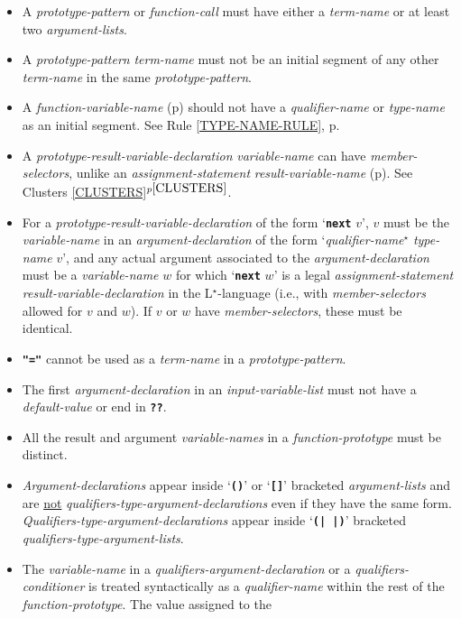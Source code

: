 \documentclass[12pt]{article}
\newcommand{\LSTAR}{L$^\star$}
\newcommand{\TT}[1]{{\tt \bfseries #1}}
\newcommand{\itemref}[1]{\ref{#1}$^{p\pageref{#1}}$}
\newcommand{\pagref}[1]{p\pageref{#1}}
\newcommand{\STAR}{{\Large $^\star$}}
\newenvironment{indpar}[1][0.3in]%
	{\begin{list}{}%
		     {\setlength{\itemsep}{0in}%
		      \setlength{\topsep}{0in}%
		      \setlength{\parsep}{1ex}%
		      \setlength{\labelwidth}{#1}%
		      \setlength{\leftmargin}{#1}%
		      \addtolength{\leftmargin}{\labelsep}}%
	 \item}%
	{\end{list}}
\begin{document}
\begin{indpar}
\begin{itemize}
\item
A {\em prototype-pattern} or {\em function-call}
must have either a {\em term-name}
or at least two {\em argu\-ment-lists}.
\item
A {\em prototype-pattern} {\em term-name} must not be
an initial segment of any other {\em term-name}
in the same {\em prototype-pattern}.
\item
A {\em function-variable-name} (\pagref{FUNCTION-VARIABLE-NAME})
should not have a {\em qualifier-name} or {\em type-name} as an initial segment.
See Rule \ref{TYPE-NAME-RULE}, \pagref{TYPE-NAME-RULE}.
\item
A {\em prototype-result-variable-declaration} {\em variable-name}
can have {\em member-selectors},
unlike an {\em assignment-statement} {\em result-variable-name}
(\pagref{RESULT-VARIABLE-NAME}).  See Clusters \itemref{CLUSTERS}.
\item
For a {\em prototype-result-variable-declaration} of the form `\TT{next} $v$',
$v$ must be the {\em vari\-able-name} in an {\em argument-declaration}
of the form `{\em qualifier-name}\STAR{} {\em type-name} $v$', and
any actual argument associated to the {\em argument-declaration}
must be a {\em variable-name} $w$ for which `\TT{next} $w$' is a legal
{\em assignment-statement} {\em result-variable-declaration} in the
\LSTAR-language (i.e., with {\em member-selectors} allowed for $v$ and
$w$).  If $v$ or $w$ have {\em member-selectors}, these must be identical.
\item
\TT{"="} cannot be used as a {\em term-name}
in a {\em prototype-pattern}.
\item
The first {\em argument-declaration} in an {\em input-variable-list}
must not have a {\em default-value} or end in \TT{??}.
\item
All the result and argument {\em variable-names}
in a {\em function-prototype} must
be distinct.
\item
{\em Argument-declarations} appear inside `\TT{()}' or `\TT{[]}'
bracketed {\em argument-lists} and are \underline{not}
{\em qualifiers-type-argument-declarations} even if they have
the same form.  {\em Qualifiers-type-argument-declarations} appear
inside `\TT{(|\,|)}' bracketed {\em qualifiers-type-argument-lists}.
\item
The {\em variable-name} in a {\em qualifiers-argument-declaration}
or a {\em qualifiers-conditioner} is treated syntactically
as a {\em qualifier-name}
within the rest of the {\em function-prototype}.  The value assigned to the

\end{itemize}
\end{indpar}
\end{document}
